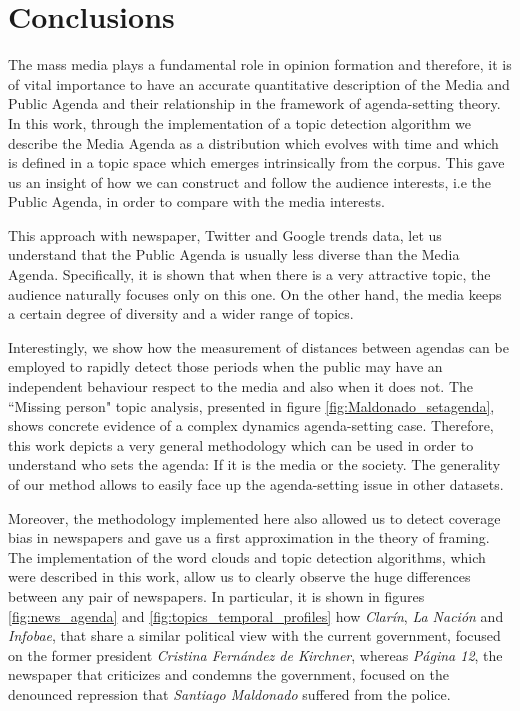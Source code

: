 \documentclass{bmcart}
\begin{document}
\section*{Conclusions}

\par The mass media plays a fundamental role in opinion formation and therefore, it is of vital importance to have an accurate quantitative description of the Media and Public Agenda and their relationship in the framework of agenda-setting theory. In this work, through the implementation of a topic detection algorithm we describe the Media Agenda as a distribution which evolves with time and which is defined in a topic space which emerges intrinsically from the corpus. This gave us an insight of how we can construct and follow the audience interests, i.e the Public Agenda, in order to compare with the media interests. 

\par This approach with newspaper, Twitter and Google trends data, let us understand that the Public Agenda is usually less diverse than the Media Agenda. Specifically, it is shown that when there is a very attractive topic, the audience naturally focuses only on this one. On the other hand, the media keeps a certain degree of diversity and a wider range of topics. 

\par Interestingly, we show how the measurement of distances between agendas can be employed to rapidly detect those periods when the public may have an independent behaviour respect to the media and also when it does not. The ``Missing person" topic analysis, presented in figure  \ref{fig:Maldonado_setagenda}, shows concrete evidence of a complex dynamics agenda-setting case. 
Therefore, this work depicts a very general methodology which can be used in order to understand who sets the agenda: If it is the media or the society. 
The generality of our method allows to easily face up the agenda-setting issue in other datasets.
 
\par Moreover, the methodology implemented here also allowed us to detect coverage bias in newspapers and gave us a first approximation in the theory of framing. The implementation of the word clouds and topic detection algorithms, which were described in this work, allow us to clearly observe the huge differences between any pair of newspapers. In particular, it is shown in figures \ref{fig:news_agenda} and \ref{fig:topics_temporal_profiles}  how \emph{Clarín}, \emph{La Nación} and \emph{Infobae}, that share a similar political view with the current government, focused on the former president \emph{Cristina Fern\'andez de Kirchner}, whereas \emph{P\'agina 12}, the newspaper that  criticizes and condemns the government, focused on the denounced repression that \emph{Santiago Maldonado} suffered from the police. 
\end{document}
